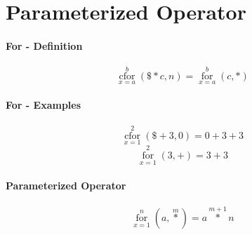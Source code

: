 \documentclass{article}
\begin{document}
\section{Parameterized Operator}
\paragraph{For - Definition}

\[ \operatorname*{cfor}_{x=a}^{b}\left(\$\ast c,n\right) = \operatorname*{for}_{x=a}^{b}\left(c,\ast \right) \]

\paragraph{For - Examples}

\[ \operatorname*{cfor}_{x=1}^{2}\left(\$+3,0\right) = 0+3+3 \]
\[ \operatorname*{for}_{x=1}^{2}\left(3,+\right) = 3+3 \]

\paragraph{Parameterized Operator}
\[ \operatorname*{for}_{x=1}^{n}\left(a,\operatorname*{\ast}^m\right) = a\operatorname*{\ast}^{m+1}n\]
\end{document}
